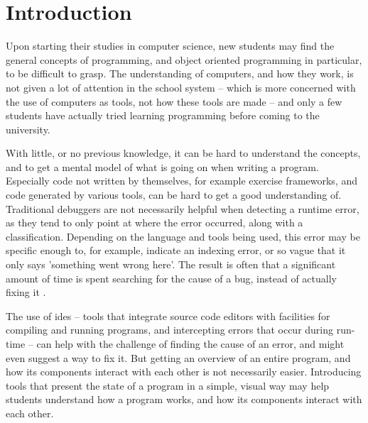 \chapter{Introduction}\label{introduction}

Upon starting their studies in computer science, new students may find the general concepts of programming, and object oriented programming in particular, to be difficult to grasp.
The understanding of computers, and how they work, is not given a lot of attention in the school system -- which is more concerned with the use of computers as tools, not how these tools are made -- and only a few students have actually tried learning programming before coming to the university. %

With little, or no previous knowledge, it can be hard to understand the concepts, and to get a mental model of what is going on when writing a program.
Especially code not written by themselves, for example exercise frameworks, and code generated by various tools, can be hard to get a good understanding of.
Traditional debuggers are not necessarily helpful when detecting a runtime error, as they tend to only point at where the error occurred, along with a classification.
Depending on the language and tools being used, this error may be specific enough to, for example, indicate an indexing error, or so vague that it only says 'something went wrong here'.
The result is often that a significant amount of time is spent searching for the cause of a bug, instead of actually fixing it \cite{ko2006}. %

The use of \glspl{ide} -- tools that integrate source code editors with facilities for compiling and running programs, and intercepting errors that occur during run-time -- can help with the challenge of finding the cause of an error, and might even suggest a way to fix it.
But getting an overview of an entire program, and how its components interact with each other is not necessarily easier.
Introducing tools that present the state of a program in a simple, visual way may help students understand how a program works, and how its components interact with each other.

